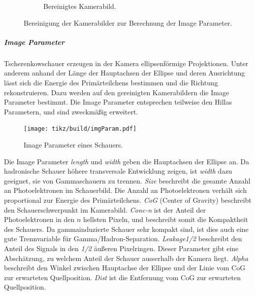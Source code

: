 \begin{figure}[ht]
\begin{subfigure}[c]{0.35\linewidth}
    \caption{Bereinigtes Kamerabild.}%
    \label{fig:cleaned}
  \end{subfigure}
  \caption{Bereinigung der Kamerabilder zur Berechnung der Image Parameter.}%
  \label{fig:cleaning}
\end{figure}

\subparagraph{Image Parameter}%
\label{spar:image_parameter}

Tscherenkowschauer erzeugen in der Kamera ellipsenförmige Projektionen.
Unter anderem anhand der Länge der Hauptachsen der Ellipse und deren Ausrichtung
lässt sich die Energie des
Primärteilchens bestimmen und die Richtung rekonstruieren.
Dazu werden auf den gereinigten Kamerabildern die Image Parameter bestimmt.
Die Image Parameter entsprechen teilweise den Hillas Parametern,
und sind zweckmäßig erweitert.


\begin{figure}
  \centering
  \texttt{[image: tikz/build/imgParam.pdf]}
  \caption{Image Parameter eines Schauers.}%
  \label{fig:hillas}
\end{figure}

Die Image Parameter \textit{length} und \textit{width} geben die Hauptachsen
der Ellipse an.
Da hadronische Schauer höhere transversale Entwicklung zeigen, ist
\textit{width} dazu geeignet, sie von Gammaschauern zu trennen.
\textit{Size} beschreibt die gesamte Anzahl an Photoelektronen im Schauerbild.
Die Anzahl an Photoelektronen verhält sich proportional zur Energie des
Primärteilchens.
\textit{CoG} (Center of Gravity) beschreibt den Schauerschwerpunkt im Kamerabild.
\textit{Conc-n} ist der Anteil der Photoelektronen in den $n$ hellsten Pixeln,
und beschreibt somit die Kompaktheit des Schauers.
Da gammainduzierte Schauer sehr kompakt sind, ist dies auch eine gute
Trennvariable für Gamma/Hadron-Separation.
\textit{Leakage1/2} beschreibt den Anteil des Signals in den \textit{1/2} äußeren
Pixelringen.
Dieser Parameter gibt eine Abschätzung,
zu welchem Anteil der Schauer ausserhalb der Kamera liegt.
\textit{Alpha} beschreibt den Winkel zwischen Hauptachse der Ellipse und
der Linie vom CoG zur erwarteten Quellposition.
\textit{Dist} ist die Entfernung vom CoG zur erwarteten Quellposition.
